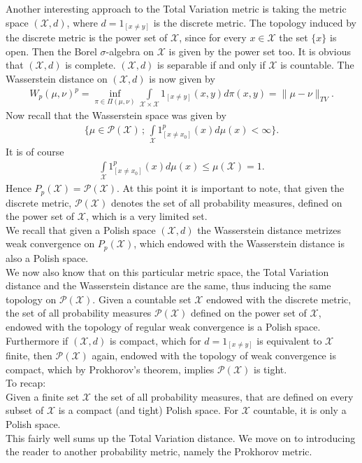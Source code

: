 \documentclass[11pt,a4paper]{article}
\begin{document}
Another interesting approach to the Total Variation metric is taking the metric space $(\mathcal{X},d)$, where $d=1_{[x\neq{}y]}$ is the discrete metric. The topology induced by the discrete metric is the power set of $\mathcal{X}$, since for every $x\in\mathcal{X}$ the set $\lbrace{}x\rbrace$ is open. Then the Borel $\sigma$-algebra on $\mathcal{X}$ is given by the power set too. It is obvious that $(\mathcal{X},d)$ is complete. $(\mathcal{X},d)$ is separable if and only if $\mathcal{X}$ is countable. The Wasserstein distance on $(\mathcal{X},d)$ is now given by
\begin{align*}
W_p(\mu,\nu)^p=\inf\limits_{\pi\in\Pi(\mu,\nu)}\int\limits_{\mathcal{X\times{}X}}1_{[x\neq{}y]}(x,y)d\pi(x,y) = \|\mu-\nu\|_{TV}.
\end{align*} 
Now recall that the Wasserstein space was given by 
\begin{align*}
\bigg\lbrace\mu\in\mathcal{P(X)}\,;\,\int\limits_{\mathcal{X}}1^p_{[x\neq{}x_0]}(x)d\mu(x)<\infty\bigg\rbrace.
\end{align*}
It is of course 
\begin{align*}
\int\limits_{\mathcal{X}}1^p_{[x\neq{}x_0]}(x)d\mu(x)\leq\mu(\mathcal{X})=1.
\end{align*}
Hence $P_p(\mathcal{X}) = \mathcal{P(X)}$. At this point it is important to note, that given the discrete metric, $\mathcal{P(X)}$ denotes the set of all probability measures, defined on the power set of $\mathcal{X}$, which is a very limited set. \vspace{1em}\\
We recall that given a Polish space $(\mathcal{X},d)$ the Wasserstein distance metrizes weak convergence on $P_p(\mathcal{X})$, which endowed with the Wasserstein distance is also a Polish space. \vspace{1em}\\
We now also know that on this particular metric space, the Total Variation distance and the Wasserstein distance are the same, thus inducing the same topology on $\mathcal{P(X)}$.
Given a countable set $\mathcal{X}$ endowed with the discrete metric, the set of all probability measures $\mathcal{P(X)}$ defined on the power set of $\mathcal{X}$, endowed with the topology of regular weak convergence is a Polish space. Furthermore if $(\mathcal{X},d)$ is compact, which for $d=1_{[x\neq{}y]}$ is equivalent to $\mathcal{X}$ finite, then $\mathcal{P(X)}$ again, endowed with the topology of weak convergence is compact, which by Prokhorov's theorem, implies $\mathcal{P(X)}$ is tight.\vspace{1em}\\
To recap:\\
Given a finite set $\mathcal{X}$ the set of all probability measures, that are defined on every subset of $\mathcal{X}$ is a compact (and tight) Polish space. For $\mathcal{X}$ countable, it is only a Polish space. \vspace{2em}\\  
This fairly well sums up the Total Variation distance. We move on to introducing the reader to another probability metric, namely the Prokhorov metric.
\end{document}

